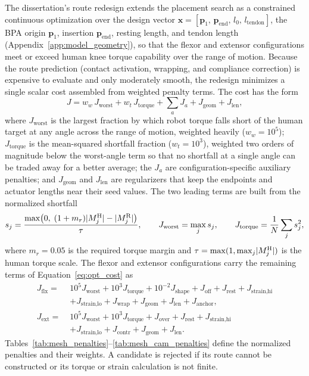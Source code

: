 The dissertation's route redesign extends the placement search as a constrained continuous optimization over the design vector $\mathbf{x} = [\mathbf{p}_{1},\, \mathbf{p}_{\mathrm{end}},\, l_{0},\, l_{\mathrm{tendon}}]$, the BPA origin $\mathbf{p}_{1}$, insertion $\mathbf{p}_{\mathrm{end}}$, resting length, and tendon length (Appendix~\ref{app:model_geometry}), so that the flexor and extensor configurations meet or exceed human knee torque capability over the range of motion. Because the route prediction (contact activation, wrapping, and compliance correction) is expensive to evaluate and only moderately smooth, the redesign minimizes a single scalar cost assembled from weighted penalty terms. The cost has the form
\begin{equation}
    J = w_{w}\,J_{\text{worst}} + w_{t}\,J_{\text{torque}} + \textstyle\sum_{a} J_{a} + J_{\text{geom}} + J_{\text{len}},
    \label{eq:opt_cost}
\end{equation}
where $J_{\text{worst}}$ is the largest fraction by which robot torque falls short of the human target at any angle across the range of motion, weighted heavily ($w_{w} = 10^{5}$); $J_{\text{torque}}$ is the mean-squared shortfall fraction ($w_{t} = 10^{3}$), weighted two orders of magnitude below the worst-angle term so that no shortfall at a single angle can be traded away for a better average; the $J_{a}$ are configuration-specific auxiliary penalties; and $J_{\text{geom}}$ and $J_{\text{len}}$ are regularizers that keep the endpoints and actuator lengths near their seed values. The two leading terms are built from the normalized shortfall
\begin{equation}
s_{j} = \frac{\max\!\left(0,\; (1+m_{r})\lvert M^{\mathrm{H}}_{j}\rvert - \lvert M^{\mathrm{R}}_{j}\rvert\right)}{\tau},
\qquad
J_{\text{worst}} = \max_{j} s_{j},
\qquad
J_{\text{torque}} = \frac{1}{N}\sum_{j} s_{j}^{2},
\label{eq:mesh_penalty_def}
\end{equation}
where $m_{r} = 0.05$ is the required torque margin and $\tau = \max(1, \max_{j}\lvert M^{\mathrm{H}}_{j}\rvert)$ is the human torque scale. The flexor and extensor configurations carry the remaining terms of Equation~\eqref{eq:opt_cost} as
\begin{align}
J_{\mathrm{flx}} =\;& 10^{5}J_{\text{worst}} + 10^{3}J_{\text{torque}} + 10^{-2}J_{\text{shape}} + J_{\text{off}} + J_{\text{rest}} + J_{\text{strain,hi}} \nonumber\\
& + J_{\text{strain,lo}} + J_{\text{wrap}} + J_{\text{geom}} + J_{\text{len}} + J_{\text{anchor}},
\label{eq:opt_cost_flx}\\[4pt]
J_{\mathrm{ext}} =\;& 10^{5}J_{\text{worst}} + 10^{3}J_{\text{torque}} + J_{\text{over}} + J_{\text{rest}} + J_{\text{strain,hi}} \nonumber\\
& + J_{\text{strain,lo}} + J_{\text{contr}} + J_{\text{geom}} + J_{\text{len}}.
\label{eq:opt_cost_ext}
\end{align}
Tables~\ref{tab:mesh_penalties}--\ref{tab:mesh_cam_penalties} define the normalized penalties and their weights. A candidate is rejected if its route cannot be constructed or its torque or strain calculation is not finite.

